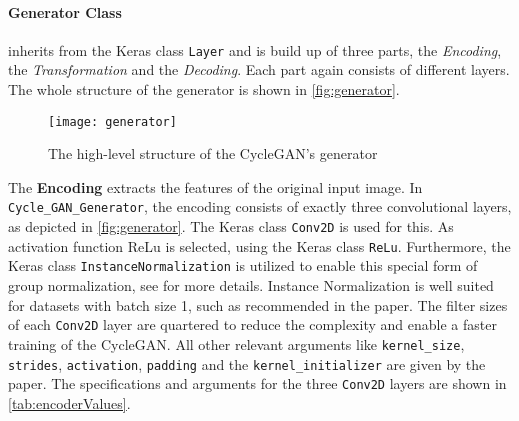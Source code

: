 \documentclass[fleqn,10pt]{SelfArx} %
\begin{document}
\paragraph{Generator Class} inherits from the Keras class \texttt{Layer} and is build up of three parts, the \textit{Encoding}, the \textit{Transformation} and the \textit{Decoding}. Each part again consists of different layers. The whole structure of the generator is shown in \autoref{fig:generator}.~\cite{Introduction-to-Cycle-GANs}

\begin{figure*}[htb] 
	\centering 
	\texttt{[image: generator]}
	\caption{The high-level structure of the Cycle\ac{GAN}'s generator \cite{Introduction-to-Cycle-GANs}}
	\label{fig:generator}
\end{figure*}

The \textbf{Encoding} extracts the features of the original input image. In \texttt{Cycle\_GAN\_Generator}, the encoding consists of exactly three convolutional layers, as depicted in \autoref{fig:generator}. The Keras class \texttt{Conv2D} is used for this. As activation function \ac{ReLu} is selected, using the Keras class \texttt{ReLu}. Furthermore, the Keras class \texttt{InstanceNormalization} is utilized to enable this special form of group normalization, see \cite{google-tf-InstanceNormalization} for more details. Instance Normalization is well suited for datasets with batch size 1, such as recommended in the paper. The filter sizes of each \texttt{Conv2D} layer are quartered to reduce the complexity and enable a faster training of the Cycle\ac{GAN}. All other relevant arguments like \texttt{kernel\_size}, \texttt{strides}, \texttt{activation}, \texttt{padding} and the \texttt{kernel\-\_initializer} are given by the paper. The specifications and arguments for the three \texttt{Conv2D} layers are shown in \autoref{tab:encoderValues}.~\cite{image-to-image-ccan}
\end{document}
